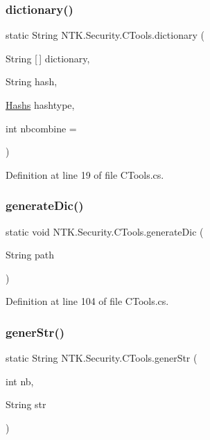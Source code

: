 \subsubsection{\texorpdfstring{dictionary()}{dictionary()}}
{\footnotesize\ttfamily static String N\+T\+K.\+Security.\+C\+Tools.\+dictionary (\begin{DoxyParamCaption}\item[{String \mbox{[}$\,$\mbox{]}}]{dictionary,  }\item[{String}]{hash,  }\item[{\mbox{\hyperlink{namespace_n_t_k_1_1_security_a7900638efc67a146821e4c0bff855eb1}{Hashs}}}]{hashtype,  }\item[{int}]{nbcombine = {} }\end{DoxyParamCaption})\hspace{0.3cm}{\ttfamily [static]}}



Definition at line 19 of file C\+Tools.\+cs.

\mbox{\label{class_n_t_k_1_1_security_1_1_c_tools_a6c3d2bec1ec15a7b20dc83f5f50bed6f}} 
\subsubsection{\texorpdfstring{generateDic()}{generateDic()}}
{\footnotesize\ttfamily static void N\+T\+K.\+Security.\+C\+Tools.\+generate\+Dic (\begin{DoxyParamCaption}\item[{String}]{path }\end{DoxyParamCaption})\hspace{0.3cm}{\ttfamily [static]}}



Definition at line 104 of file C\+Tools.\+cs.

\mbox{\label{class_n_t_k_1_1_security_1_1_c_tools_a2ce591edf4dc18161d1a8e27ff43d149}} 
\subsubsection{\texorpdfstring{generStr()}{generStr()}}
{\footnotesize\ttfamily static String N\+T\+K.\+Security.\+C\+Tools.\+gener\+Str (\begin{DoxyParamCaption}\item[{int}]{nb,  }\item[{String}]{str }\end{DoxyParamCaption})\hspace{0.3cm}{\ttfamily [static]}}



